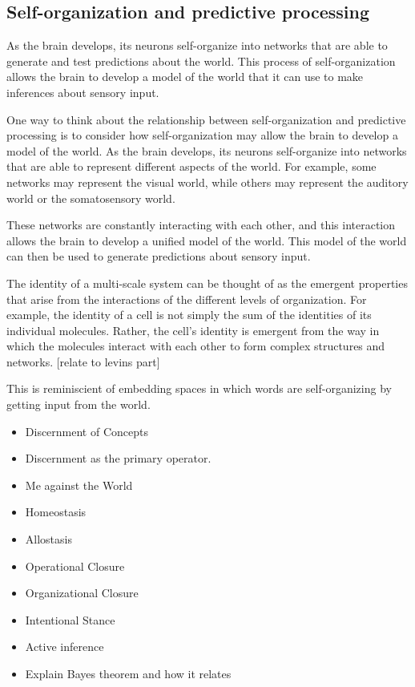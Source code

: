 \subsection{Self-organization and predictive processing} \cite{friston_world_2021}
As the brain develops, its neurons self-organize into networks that are able to generate and test predictions about the world. This process of self-organization allows the brain to develop a model of the world that it can use to make inferences about sensory input.

One way to think about the relationship between self-organization and predictive processing is to consider how self-organization may allow the brain to develop a model of the world. As the brain develops, its neurons self-organize into networks that are able to represent different aspects of the world. For example, some networks may represent the visual world, while others may represent the auditory world or the somatosensory world.

These networks are constantly interacting with each other, and this interaction allows the brain to develop a unified model of the world. This model of the world can then be used to generate predictions about sensory input.

The identity of a multi-scale system can be thought of as the emergent properties that arise from the interactions of the different levels of organization. For example, the identity of a cell is not simply the sum of the identities of its individual molecules. Rather, the cell's identity is emergent from the way in which the molecules interact with each other to form complex structures and networks. [relate to levins part]

This is reminiscient of embedding spaces in which words are self-organizing by getting input from the world. 




\begin{itemize}
    \item Discernment of Concepts
    \item Discernment as the primary operator. 
    \item Me against the World
    \item Homeostasis
    \item Allostasis
    \item Operational Closure
    \item Organizational Closure
    \item Intentional Stance
    \item Active inference
    \item Explain Bayes theorem and how it relates 
\end{itemize}





